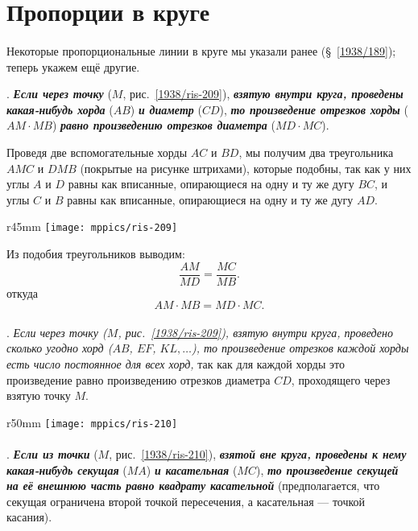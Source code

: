 \section{Пропорции в круге}

\paragraph{}\label{1938/199}
Некоторые пропорциональные линии в круге мы указали ранее (§~\ref{1938/189});
теперь укажем ещё другие.

\smallskip
\mbox{.}
\textbf{\emph{Если через точку}} ($M$, рис.~\ref{1938/ris-209}), \textbf{\emph{взятую внутри круга, проведены какая-нибудь хорда}} ($AB$) \textbf{\emph{и диаметр}} ($CD$), \textbf{\emph{то произведение отрезков хорды}} ($AM\cdot  MB$) \textbf{\emph{равно произведению отрезков диаметра}} ($MD\cdot  MC$).

Проведя две вспомогательные хорды $AC$ и $BD$, мы получим два треугольника $AMC$ и $DMB$ (покрытые на рисунке штрихами), которые подобны, так как у них углы $A$ и $D$ равны как вписанные, опирающиеся на одну и ту же дугу $BC$, и углы $C$ и $B$ равны как вписанные, опирающиеся на одну и ту же дугу $AD$.

\begin{wrapfigure}{r}{45mm}
\vskip-0mm
\centering
\texttt{[image: mppics/ris-209]}
\caption{}\label{1938/ris-209}
\end{wrapfigure}

Из подобия треугольников выводим:
\[\frac{AM}{MD}=\frac{MC}{MB}.\]
откуда
\[AM\cdot  MB=MD\cdot  MC.\]

\paragraph{}\label{1938/200}
\mbox{.}
\emph{Если через точку \emph{($M$, рис.~\ref{1938/ris-209}),} взятую внутри круга, проведено сколько угодно хорд ($AB$, $EF$, $KL,\dots$), то произведение отрезков каждой хорды есть число постоянное для всех хорд,} так как для каждой хорды это произведение равно произведению отрезков диаметра $CD$, проходящего через взятую точку $M$.

\begin{wrapfigure}{r}{50mm}
\vskip-6mm
\centering
\texttt{[image: mppics/ris-210]}
\caption{}\label{1938/ris-210}
\end{wrapfigure}

\paragraph{}\label{1938/201}
\mbox{.}
\textbf{\emph{Если из точки}} ($M$, рис.~\ref{1938/ris-210}), \textbf{\emph{взятой вне круга, проведены к нему какая-нибудь секущая}} ($MA$) \textbf{\emph{и касательная}} ($MC$), \textbf{\emph{то произведение секущей на её внешнюю часть равно квадрату касательной}} (предполагается, что секущая ограничена второй точкой пересечения, а касательная — точкой касания).

